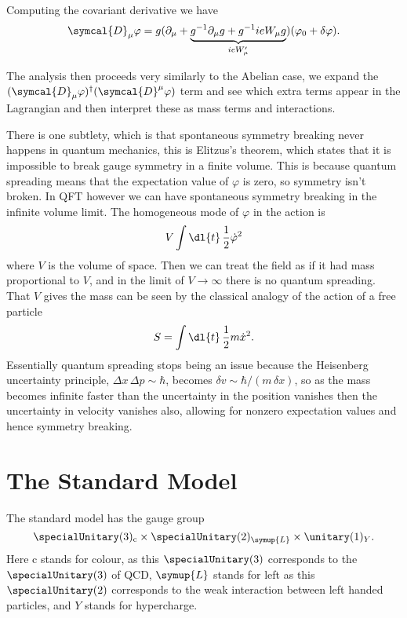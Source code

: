 \documentclass[fleqn]{NotesClass}
\newcommand{\hermit}{\dagger}
\newcommand{\Left}{\symup{L}}
\newcommand{\covariantDerivative}{\symcal{D}}
\begin{document}
    Computing the covariant derivative we have
    \begin{equation}
        \covariantDerivative_\mu \varphi = g(\partial_\mu + \underbrace{g^{-1} \partial_\mu g + g^{-1} ie W_\mu g}_{ieW'_\mu})(\varphi_0 + \delta \varphi).
    \end{equation}
    
    The analysis then proceeds very similarly to the Abelian case, we expand the \((\covariantDerivative_\mu \varphi)^\hermit (\covariantDerivative^\mu \varphi)\) term and see which extra terms appear in the Lagrangian and then interpret these as mass terms and interactions.
    
    There is one subtlety, which is that spontaneous symmetry breaking never happens in quantum mechanics, this is Elitzus's theorem, which states that it is impossible to break gauge symmetry in a finite volume.
    This is because quantum spreading means that the expectation value of \(\varphi\) is zero, so symmetry isn't broken.
    In QFT however we can have spontaneous symmetry breaking in the infinite volume limit.
    The homogeneous mode of \(\varphi\) in the action is
    \begin{equation}
        V \int \dl{t} \, \frac{1}{2} \dot{\varphi}^2
    \end{equation}
    where \(V\) is the volume of space.
    Then we can treat the field as if it had mass proportional to \(V\), and in the limit of \(V \to \infty\) there is no quantum spreading.
    That \(V\) gives the mass can be seen by the classical analogy of the action of a free particle
    \begin{equation}
        S = \int \dl{t} \, \frac{1}{2}m\dot{x}^2.
    \end{equation}
    Essentially quantum spreading stops being an issue because the Heisenberg uncertainty principle, \(\Delta x \, \Delta p \sim \hbar\), becomes \(\delta v \sim \hbar/(m \, \delta x)\), so as the mass becomes infinite faster than the uncertainty in the position vanishes then the uncertainty in velocity vanishes also, allowing for nonzero expectation values and hence symmetry breaking.
    
    \chapter{The Standard Model}
    The standard model has the gauge group
    \begin{equation}
        \specialUnitary(3)_{\mathrm{c}} \times \specialUnitary(2)_{\Left} \times \unitary(1)_{Y}.
    \end{equation}
    Here \(\mathrm{c}\) stands for colour, as this \(\specialUnitary(3)\) corresponds to the \(\specialUnitary(3)\) of QCD, \(\Left\) stands for left as this \(\specialUnitary(2)\) corresponds to the weak interaction between left handed particles, and \(Y\) stands for hypercharge.
    
\end{document}
